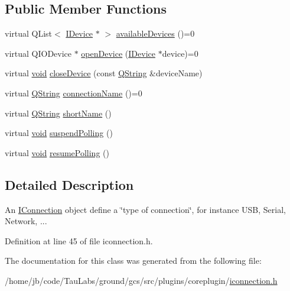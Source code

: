 \subsection*{\-Public \-Member \-Functions}
\begin{DoxyCompactItemize}
\item 
virtual \-Q\-List$<$ \hyperlink{class_core_1_1_i_device}{\-I\-Device} $\ast$ $>$ \hyperlink{group___core_plugin_ga2766d577d1343dfbd7f41859363cad29}{available\-Devices} ()=0
\item 
virtual \-Q\-I\-O\-Device $\ast$ \hyperlink{group___core_plugin_ga9fa3de80c2899c62813961082ad48e95}{open\-Device} (\hyperlink{class_core_1_1_i_device}{\-I\-Device} $\ast$device)=0
\item 
virtual \hyperlink{group___u_a_v_objects_plugin_ga444cf2ff3f0ecbe028adce838d373f5c}{void} \hyperlink{group___core_plugin_ga5264be67cf0d9ca62aae564737389b1d}{close\-Device} (const \hyperlink{group___u_a_v_objects_plugin_gab9d252f49c333c94a72f97ce3105a32d}{\-Q\-String} \&device\-Name)
\item 
virtual \hyperlink{group___u_a_v_objects_plugin_gab9d252f49c333c94a72f97ce3105a32d}{\-Q\-String} \hyperlink{group___core_plugin_ga65bb74489e016d9863f42f0bb87afd8c}{connection\-Name} ()=0
\item 
virtual \hyperlink{group___u_a_v_objects_plugin_gab9d252f49c333c94a72f97ce3105a32d}{\-Q\-String} \hyperlink{group___core_plugin_gad436df0a83378128cb8034d83e6734f0}{short\-Name} ()
\item 
virtual \hyperlink{group___u_a_v_objects_plugin_ga444cf2ff3f0ecbe028adce838d373f5c}{void} \hyperlink{group___core_plugin_gac0a12e1d5a84be9528ce09595b424438}{suspend\-Polling} ()
\item 
virtual \hyperlink{group___u_a_v_objects_plugin_ga444cf2ff3f0ecbe028adce838d373f5c}{void} \hyperlink{group___core_plugin_gae3937027985048723454f1ad7d118d1a}{resume\-Polling} ()
\end{DoxyCompactItemize}


\subsection{\-Detailed \-Description}
\-An \hyperlink{class_core_1_1_i_connection}{\-I\-Connection} object define a \char`\"{}type of connection\char`\"{}, for instance \-U\-S\-B, \-Serial, \-Network, ... 

\-Definition at line 45 of file iconnection.\-h.



\-The documentation for this class was generated from the following file\-:\begin{DoxyCompactItemize}
\item 
/home/jb/code/\-Tau\-Labs/ground/gcs/src/plugins/coreplugin/\hyperlink{iconnection_8h}{iconnection.\-h}\end{DoxyCompactItemize}
